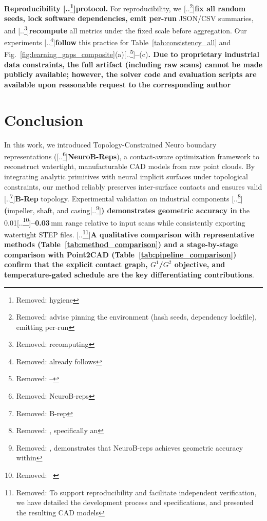 \documentclass{ieeeaccess}
\providecommand{\DIFaddtex}[1]{{\color{blue}\bfseries #1}} %
\providecommand{\DIFdeltex}[1]{{\color{red}[..\footnote{\color{black}Removed: #1}]}} %
\providecommand{\DIFaddbegin}{} %
\providecommand{\DIFaddend}{} %
\providecommand{\DIFdelbegin}{} %
\providecommand{\DIFdelend}{} %
\providecommand{\DIFadd}[1]{\texorpdfstring{\DIFaddtex{#1}}{#1}} %
\providecommand{\DIFdel}[1]{\texorpdfstring{\DIFdeltex{#1}}{}} %
\begin{document}
\textbf{Reproducibility \DIFdelbegin \DIFdel{hygiene}\DIFdelend \DIFaddbegin \DIFadd{protocol}\DIFaddend .} For reproducibility, we \DIFdelbegin \DIFdel{advise
pinning the environment (hash seeds, dependency lockfile), emitting
per‑run }\DIFdelend \DIFaddbegin \DIFadd{fix all random seeds, lock software dependencies, emit per-run }\DIFaddend JSON/CSV summaries, and \DIFdelbegin \DIFdel{recomputing }\DIFdelend \DIFaddbegin \DIFadd{recompute }\DIFaddend all metrics under the fixed scale before aggregation. Our experiments \DIFdelbegin \DIFdel{already follows }\DIFdelend \DIFaddbegin \DIFadd{follow }\DIFaddend this practice for Table~\ref{tab:consistency_all} and Fig.~\ref{fig:learning_gaps_composite}(a)\DIFdelbegin \DIFdel{–}\DIFdelend \DIFaddbegin \DIFadd{--}\DIFaddend (c)\DIFaddbegin \DIFadd{. Due to proprietary industrial data constraints, the full artifact (including raw scans) cannot be made publicly available; however, the solver code and evaluation scripts are available upon reasonable request to the corresponding author
}\DIFaddend 


\section{Conclusion}
\DIFaddbegin \label{sec:conclusion}
\DIFaddend In this work, we introduced Topology-Constrained Neuro boundary representations (\DIFdelbegin \DIFdel{NeuroB-reps}\DIFdelend \DIFaddbegin \DIFadd{NeuroB-Reps}\DIFaddend ), a contact-aware optimization framework to reconstruct watertight, manufacturable CAD models from raw point clouds. By integrating analytic primitives with neural implicit surfaces under topological constraints, our method reliably preserves inter-surface contacts and ensures valid \DIFdelbegin \DIFdel{B-rep }\DIFdelend \DIFaddbegin \DIFadd{B-Rep }\DIFaddend topology. Experimental validation on industrial components \DIFdelbegin \DIFdel{, specifically an }\DIFdelend \DIFaddbegin \DIFadd{(}\DIFaddend impeller, shaft, and casing\DIFdelbegin \DIFdel{, demonstrates that NeuroB-reps achieves geometric accuracy within }\DIFdelend \DIFaddbegin \DIFadd{) demonstrates geometric accuracy in }\DIFaddend the 0.01\DIFdelbegin \DIFdel{~}\DIFdelend \DIFaddbegin \DIFadd{--0.03\,}\DIFaddend mm range relative to input scans while consistently exporting watertight STEP files. \DIFdelbegin \DIFdel{To support reproducibility and facilitate independent verification, we have detailed the development process and specifications, and presented the resulting CAD models}\DIFdelend \DIFaddbegin \DIFadd{A qualitative comparison with representative methods (Table~\ref{tab:method_comparison}) and a stage-by-stage comparison with Point2CAD (Table~\ref{tab:pipeline_comparison}) confirm that the explicit contact graph, $G^1$/$G^2$ objective, and temperature-gated schedule are the key differentiating contributions}\DIFaddend .
\end{document}
